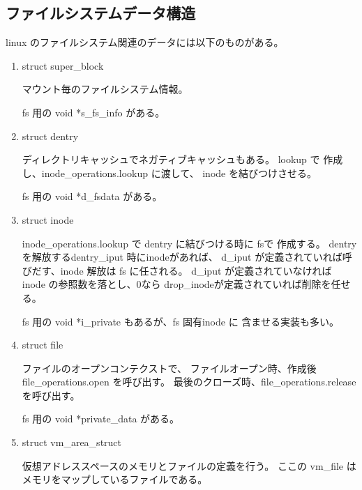 \subsection{ファイルシステムデータ構造}
	linux のファイルシステム関連のデータには以下のものがある。
	\begin{enumerate}
	\item	struct super_block \par
		マウント毎のファイルシステム情報。

		fs 用の void *s_fs_info がある。
	\item	struct dentry \par
		ディレクトリキャッシュでネガティブキャッシュもある。
		lookup で 作成し、inode_operations.lookup に渡して、
		inode を結びつけさせる。

		fs 用の void *d_fsdata がある。
	\item	struct inode \par
		inode_operations.lookup で dentry に結びつける時に fsで
		作成する。
		dentry を解放するdentry_iput 時にinodeがあれば、
		d_iput が定義されていれば呼びだす、inode 解放は fs に任される。
		d_iput が定義されていなければ inode の参照数を落とし、0なら
		drop_inodeが定義されていれば削除を任せる。


		fs 用の void *i_private もあるが、fs 固有inode に
                含ませる実装も多い。
	\item	struct file \par
		ファイルのオープンコンテクストで、
		ファイルオープン時、作成後 file_operations.open を呼び出す。
		最後のクローズ時、file_operations.release を呼び出す。

		fs 用の void *private_data がある。

	\item	struct vm_area_struct \par
		仮想アドレススペースのメモリとファイルの定義を行う。
		ここの vm_file はメモリをマップしているファイルである。
	\end{enumerate}
\clearpage

